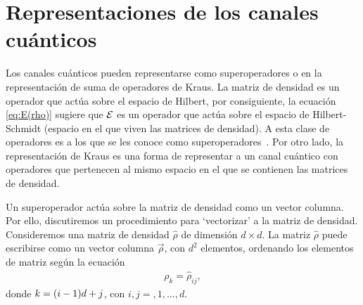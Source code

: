 \section{Representaciones de los canales cuánticos} %
\label{sec:qtm-channels-representation}

Los canales cuánticos pueden representarse como superoperadores
o en la representación de suma de operadores de Kraus. 
La matriz de densidad es un operador que actúa sobre el espacio 
de Hilbert, por consiguiente, la ecuación \eqref{eq:E(rho)} 
sugiere que $\mathcal{E}$ es un operador que actúa sobre el espacio 
de Hilbert-Schmidt (espacio en el que viven las matrices de densidad). 
A esta clase de operadores es a los que se les conoce como 
superoperadores~\cite{preskill1998lecture}.
Por otro lado, la representación de Kraus es una forma de 
representar a un canal cuántico con operadores que pertenecen
al mismo espacio en el que se contienen las matrices de densidad.

Un superoperador actúa sobre la matriz de densidad 
como un vector columna. Por ello, discutiremos un procedimiento 
para `vectorizar' a la matriz de densidad.
Consideremos una matriz de densidad $\hat{\rho}$ de dimensión $d\times d$.
La matriz $\hat{\rho}$ puede escribirse como 
un vector columna $\vec{\rho}$, con $d^2$ elementos, 
ordenando los elementos de matriz según la ecuación  
\begin{align}
\rho_k=\hat{\rho}_{ij}, 
\label{eq:matrix-to-vector}
\end{align}
donde $k=\qty(i-1)d+j$, con $i,j=,1,\ldots,d$. 

